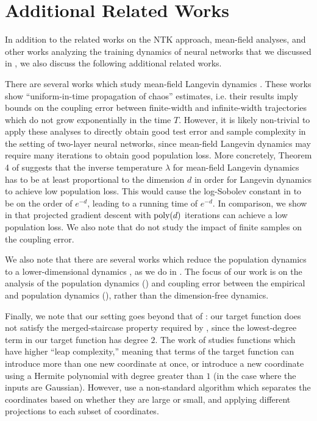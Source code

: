 \section{Additional Related Works}

In addition to the related works on the NTK approach, mean-field analyses, and other works analyzing the training dynamics of neural networks that we discussed in , we also discuss the following additional related works.

There are several works which study mean-field Langevin dynamics \citep{chen2023uniformintime, suzuki2023convergence}. These works show ``uniform-in-time propagation of chaos'' estimates, i.e. their results imply bounds on the coupling error between finite-width and infinite-width trajectories which do not grow exponentially in the time $T$. However, it is likely non-trivial to apply these analyses to directly obtain good test error and sample complexity in the setting of two-layer neural networks, since mean-field Langevin dynamics may require many iterations to obtain good population loss. More concretely, Theorem 4 of \citet{mei2018mean} suggests that the inverse temperature $\lambda$ for mean-field Langevin dynamics has to be at least proportional to the dimension $d$ in order for Langevin dynamics to achieve low population loss. This would cause the log-Sobolev constant in \citet{suzuki2023convergence} to be on the order of $e^{-d}$, leading to a running time of $e^{-d}$. In comparison, we show in  that projected gradient descent with $\textup{poly}(d)$ iterations can achieve a low population loss. We also note that \citet{chen2023uniformintime} do not study the impact of finite samples on the coupling error.

We also note that there are several works which reduce the population dynamics to a lower-dimensional dynamics \citep{abbe2022merged, hajjar2023symmetries, arnaboldi2023highdimensional}, as we do in . The focus of our work is on the analysis of the population dynamics () and coupling error between the empirical and population dynamics (), rather than the dimension-free dynamics.

Finally, we note that our setting goes beyond that of \citet{abbe2022merged}: our target function does not satisfy the merged-staircase property required by \citet{abbe2022merged}, since the lowest-degree term in our target function has degree $2$. The work of \citet{abbe2023sgd} studies functions which have higher ``leap complexity,'' meaning that terms of the target function can introduce more than one new coordinate at once, or introduce a new coordinate using a Hermite polynomial with degree greater than $1$ (in the case where the inputs are Gaussian). However, \citet{abbe2023sgd} use a non-standard algorithm which separates the coordinates based on whether they are large or small, and applying different projections to each subset of coordinates.